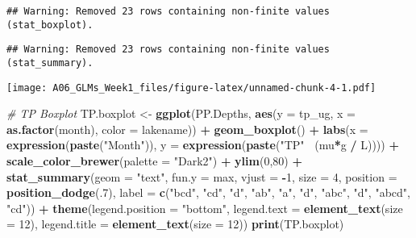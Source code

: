 \documentclass[]{article}
\newenvironment{Shaded}{\begin{snugshade}}{\end{snugshade}}
\newcommand{\KeywordTok}[1]{\textcolor[rgb]{0.13,0.29,0.53}{\textbf{#1}}}
\newcommand{\DataTypeTok}[1]{\textcolor[rgb]{0.13,0.29,0.53}{#1}}
\newcommand{\DecValTok}[1]{\textcolor[rgb]{0.00,0.00,0.81}{#1}}
\newcommand{\StringTok}[1]{\textcolor[rgb]{0.31,0.60,0.02}{#1}}
\newcommand{\CommentTok}[1]{\textcolor[rgb]{0.56,0.35,0.01}{\textit{#1}}}
\newcommand{\OperatorTok}[1]{\textcolor[rgb]{0.81,0.36,0.00}{\textbf{#1}}}
\newcommand{\NormalTok}[1]{#1}
\begin{document}
\begin{verbatim}
## Warning: Removed 23 rows containing non-finite values (stat_boxplot).
\end{verbatim}

\begin{verbatim}
## Warning: Removed 23 rows containing non-finite values (stat_summary).
\end{verbatim}

\texttt{[image: A06\_GLMs\_Week1\_files/figure-latex/unnamed-chunk-4-1.pdf]}

\begin{Shaded}
\begin{Highlighting}[]
\CommentTok{# TP Boxplot}
\NormalTok{TP.boxplot <-}\StringTok{ }
\StringTok{    }\KeywordTok{ggplot}\NormalTok{(PP.Depths, }\KeywordTok{aes}\NormalTok{(}\DataTypeTok{y =}\NormalTok{ tp_ug, }\DataTypeTok{x =} \KeywordTok{as.factor}\NormalTok{(month),  }\DataTypeTok{color =}\NormalTok{ lakename)) }\OperatorTok{+}
\StringTok{      }\KeywordTok{geom_boxplot}\NormalTok{() }\OperatorTok{+}
\StringTok{  }\KeywordTok{labs}\NormalTok{(}\DataTypeTok{x =} \KeywordTok{expression}\NormalTok{(}\KeywordTok{paste}\NormalTok{(}\StringTok{"Month"}\NormalTok{)),}
       \DataTypeTok{y =} \KeywordTok{expression}\NormalTok{(}\KeywordTok{paste}\NormalTok{(}\StringTok{"TP"}\OperatorTok{~}\StringTok{ }\NormalTok{(mu}\OperatorTok{*}\NormalTok{g }\OperatorTok{/}\StringTok{ }\NormalTok{L)))) }\OperatorTok{+}
\StringTok{  }\KeywordTok{scale_color_brewer}\NormalTok{(}\DataTypeTok{palette =} \StringTok{"Dark2"}\NormalTok{) }\OperatorTok{+}
\StringTok{  }\KeywordTok{ylim}\NormalTok{(}\DecValTok{0}\NormalTok{,}\DecValTok{80}\NormalTok{) }\OperatorTok{+}
\StringTok{      }\KeywordTok{stat_summary}\NormalTok{(}\DataTypeTok{geom =} \StringTok{"text"}\NormalTok{, }\DataTypeTok{fun.y =}\NormalTok{ max, }\DataTypeTok{vjust =} \OperatorTok{-}\DecValTok{1}\NormalTok{, }\DataTypeTok{size =} \DecValTok{4}\NormalTok{, }\DataTypeTok{position =} \KeywordTok{position_dodge}\NormalTok{(.}\DecValTok{7}\NormalTok{),}
                   \DataTypeTok{label =} \KeywordTok{c}\NormalTok{(}\StringTok{"bcd"}\NormalTok{, }\StringTok{"cd"}\NormalTok{, }\StringTok{"d"}\NormalTok{, }\StringTok{"ab"}\NormalTok{, }\StringTok{"a"}\NormalTok{, }\StringTok{"d"}\NormalTok{, }\StringTok{"abc"}\NormalTok{, }\StringTok{"d"}\NormalTok{, }\StringTok{"abcd"}\NormalTok{, }\StringTok{"cd"}\NormalTok{)) }\OperatorTok{+}
\StringTok{      }\KeywordTok{theme}\NormalTok{(}\DataTypeTok{legend.position =} \StringTok{"bottom"}\NormalTok{, }
        \DataTypeTok{legend.text =} \KeywordTok{element_text}\NormalTok{(}\DataTypeTok{size =} \DecValTok{12}\NormalTok{), }\DataTypeTok{legend.title =} \KeywordTok{element_text}\NormalTok{(}\DataTypeTok{size =} \DecValTok{12}\NormalTok{))}
\KeywordTok{print}\NormalTok{(TP.boxplot)}
\end{Highlighting}
\end{Shaded}
\end{document}
